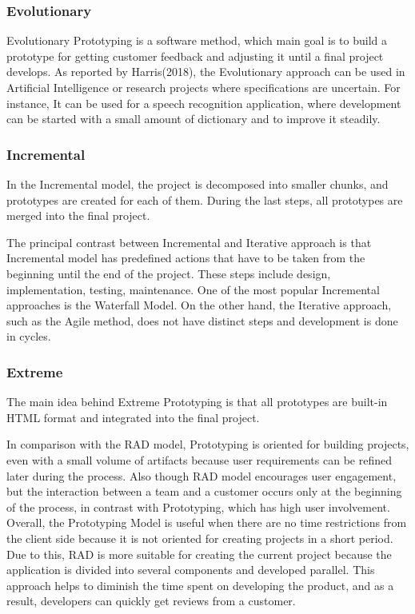 \documentclass[a4paper]{article}
\begin{document}
    \subsubsection{Evolutionary}
   Evolutionary Prototyping is a software method, which main goal is to build a prototype for getting customer feedback and adjusting it until a final project develops. As reported by Harris(2018), the Evolutionary approach can be used in Artificial Intelligence or research projects where specifications are uncertain.
   For instance, It can be used for a speech recognition application, where development can be started with a small amount of dictionary and to improve it steadily.
    
    \subsubsection{Incremental}
    In the Incremental model, the project is decomposed into smaller chunks, and prototypes are created for each of them. During the last steps, all prototypes are merged into the final project. 
    
    The principal contrast between Incremental and Iterative approach is that Incremental model has predefined actions that have to be taken from the beginning until the end of the project. These steps include design, implementation, testing, maintenance. One of the most popular Incremental approaches is the Waterfall Model. On the other hand, the Iterative approach, such as the Agile method, does not have distinct steps and development is done in cycles.
    

    \subsubsection{Extreme}
    The main idea behind Extreme Prototyping is that all prototypes are built-in HTML format and integrated into the final project. 

    In comparison with the RAD model, Prototyping is oriented for building projects, even with a small volume of artifacts because user requirements can be refined later during the process. Also though RAD model encourages user engagement, but the interaction between a team and a customer occurs only at the beginning of the process, in contrast with Prototyping, which has high user involvement. \\
    
    Overall, the Prototyping Model is useful when there are no time restrictions from the client side because it is not oriented for creating projects in a short period. 
    Due to this, RAD is more suitable for creating the current project because the application is divided into several components and developed parallel. This approach helps to diminish the time spent on developing the product, and as a result, developers can quickly get reviews from a customer.
    
\end{document}
